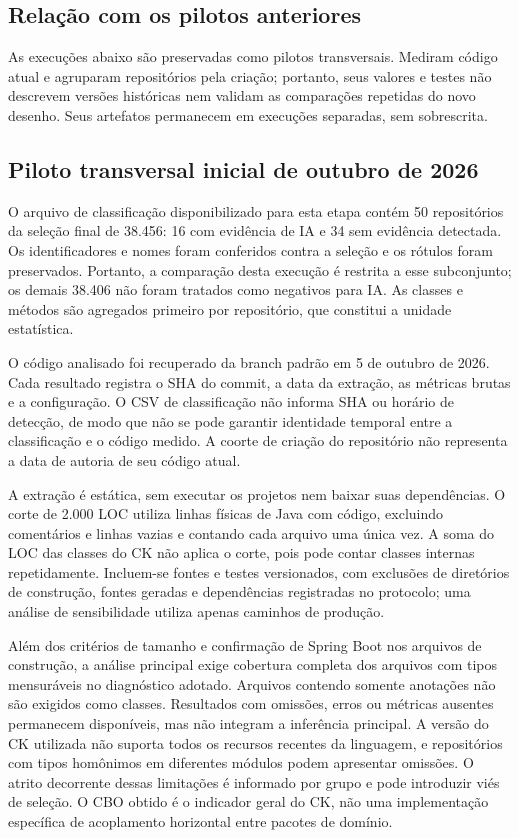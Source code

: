 \subsection{Relação com os pilotos anteriores}

As execuções abaixo são preservadas como pilotos transversais. Mediram código atual e agruparam repositórios pela criação; portanto, seus valores e testes não descrevem versões históricas nem validam as comparações repetidas do novo desenho. Seus artefatos permanecem em execuções separadas, sem sobrescrita.

\subsection{Piloto transversal inicial de outubro de 2026}
\label{subsec:execucao-ck}

O arquivo de classificação disponibilizado para esta etapa contém 50 repositórios da seleção final de 38.456: 16 com evidência de IA e 34 sem evidência detectada. Os identificadores e nomes foram conferidos contra a seleção e os rótulos foram preservados. Portanto, a comparação desta execução é restrita a esse subconjunto; os demais 38.406 não foram tratados como negativos para IA. As classes e métodos são agregados primeiro por repositório, que constitui a unidade estatística.

O código analisado foi recuperado da branch padrão em 5 de outubro de 2026. Cada resultado registra o SHA do commit, a data da extração, as métricas brutas e a configuração. O CSV de classificação não informa SHA ou horário de detecção, de modo que não se pode garantir identidade temporal entre a classificação e o código medido. A coorte de criação do repositório não representa a data de autoria de seu código atual.

A extração é estática, sem executar os projetos nem baixar suas dependências. O corte de 2.000 LOC utiliza linhas físicas de Java com código, excluindo comentários e linhas vazias e contando cada arquivo uma única vez. A soma do LOC das classes do CK não aplica o corte, pois pode contar classes internas repetidamente. Incluem-se fontes e testes versionados, com exclusões de diretórios de construção, fontes geradas e dependências registradas no protocolo; uma análise de sensibilidade utiliza apenas caminhos de produção.

Além dos critérios de tamanho e confirmação de Spring Boot nos arquivos de construção, a análise principal exige cobertura completa dos arquivos com tipos mensuráveis no diagnóstico adotado. Arquivos contendo somente anotações não são exigidos como classes. Resultados com omissões, erros ou métricas ausentes permanecem disponíveis, mas não integram a inferência principal. A versão do CK utilizada não suporta todos os recursos recentes da linguagem, e repositórios com tipos homônimos em diferentes módulos podem apresentar omissões. O atrito decorrente dessas limitações é informado por grupo e pode introduzir viés de seleção. O CBO obtido é o indicador geral do CK, não uma implementação específica de acoplamento horizontal entre pacotes de domínio.

